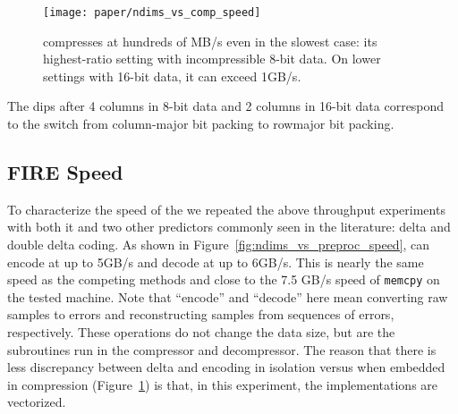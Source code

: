 \begin{figure}[h]
\begin{center}
    \texttt{[image: paper/ndims\_vs\_comp\_speed]}
    \caption{\minesp compresses at hundreds of MB/s even in the slowest case: its highest-ratio setting with incompressible 8-bit data. On lower settings with 16-bit data, it can exceed 1GB/s.}
    \label{fig:ndims_vs_comp_speed}
\end{center}
\end{figure}


The dips after 4 columns in 8-bit data and 2 columns in 16-bit data correspond to the switch from column-major bit packing to rowmajor bit packing.

\subsection{FIRE Speed}

To characterize the speed of the \fire we repeated the above throughput experiments with both it and two other predictors commonly seen in the literature: delta and double delta coding. As shown in Figure~\ref{fig:ndims_vs_preproc_speed}, \fire can encode at up to 5GB/s and decode at up to 6GB/s. This is nearly the same speed as the competing methods and close to the 7.5 GB/s speed of \texttt{memcpy} on the tested machine. Note that ``encode'' and ``decode'' here mean converting raw samples to errors and reconstructing samples from sequences of errors, respectively. These operations do not change the data size, but are the subroutines run in the \minesp compressor and decompressor. The reason that there is less discrepancy between delta and \fire encoding in isolation versus when embedded in \minesp compression (Figure~\ref{fig:ndims_vs_comp_speed}) is that, in this experiment, the implementations are vectorized.

